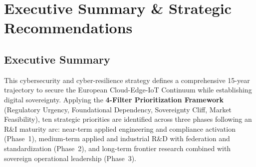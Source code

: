\documentclass{ieeeaccess}
\begin{document}

\newpage

\section{Executive Summary \& Strategic Recommendations}
\label{sec:exec_summary}
\label{sec:executive_summary}

\subsection*{Executive Summary}

This cybersecurity and cyber-resilience strategy defines a comprehensive
15-year trajectory to secure the European Cloud-Edge-IoT Continuum while
establishing digital sovereignty. Applying the \textbf{4-Filter
Prioritization Framework} (Regulatory Urgency, Foundational Dependency,
Sovereignty Cliff, Market Feasibility), ten strategic priorities are
identified across three phases following an R\&I maturity arc: near-term
applied engineering and compliance activation (Phase~1), medium-term
applied and industrial R\&D with federation and standardization (Phase~2),
and long-term frontier research combined with sovereign operational
leadership (Phase~3).
\end{document}
